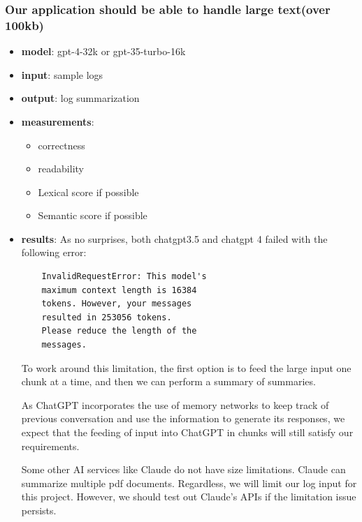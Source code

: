 \documentclass[conference]{IEEEtran}
\begin{document}
\subsubsection{Our application should be able to handle large text(over 100kb)}
\begin{itemize}
    \item \textbf{model}: gpt-4-32k or gpt-35-turbo-16k 
    \item \textbf{input}: sample logs
    \item \textbf{output}: log summarization
    \item \textbf{measurements}:
    \begin{itemize}
        \item correctness
        \item readability
        \item Lexical score if possible
        \item Semantic score if possible
    \end{itemize}
    \item \textbf{results}:
    As no surprises, both chatgpt3.5 and chatgpt 4 failed with the following error: 
    \begin{lstlisting}
    InvalidRequestError: This model's 
    maximum context length is 16384 
    tokens. However, your messages 
    resulted in 253056 tokens. 
    Please reduce the length of the 
    messages.
    \end{lstlisting}

    To work around this limitation, the first option is to feed the large input one chunk at a time, and then we can perform a summary of summaries. 
    
    As ChatGPT incorporates the use of memory networks to keep track of previous conversation and use the information to generate its responses, we expect that the feeding of input into ChatGPT in chunks will still satisfy our requirements.

    Some other AI services like Claude do not have size limitations. Claude can summarize multiple pdf documents. Regardless, we will limit our log input for this project. However, we should test out Claude's APIs if the limitation issue persists.
    
\end{itemize}
\end{document}
